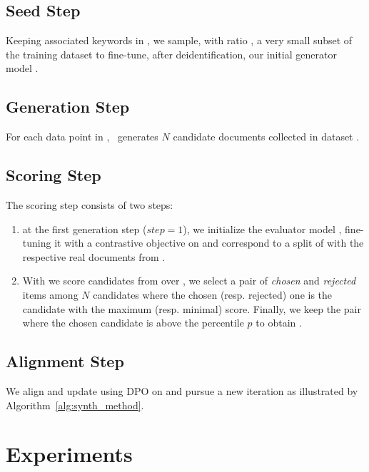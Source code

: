 \subsection{Seed Step}
Keeping associated keywords in \ksft, we sample, with ratio \rsft, a very small subset of the training dataset \dtr to fine-tune, after deidentification, our initial generator model \mg.

\subsection{Generation Step}
For each data point in \kgen, \mg\ generates $N$ candidate documents collected in dataset \dgen.

\subsection{Scoring Step}
\label{sec:synth_score}
The scoring step consists of two steps:
\begin{enumerate}
    \item at the first generation step ($step = 1$), we initialize the evaluator model \me, fine-tuning it with a contrastive objective on \dcstar and \dc correspond to a split of \dgstar with the respective real documents from \dgen.
    
    \item With \me we score candidates from \dgstar over 
    \dgen, we select a pair of \textit{chosen} and \textit{rejected} items among $N$ candidates where the chosen (resp. rejected) one is the candidate with the maximum (resp. minimal) score. Finally, we keep the pair where the chosen candidate is above the percentile $p$ to obtain \ddpo.
\end{enumerate}

\subsection{Alignment Step}
We align and update \mg using DPO on \ddpo and pursue a new iteration as illustrated by Algorithm~\ref{alg:synth_method}. 

\section{Experiments}
\label{sec:synth_experiment}

